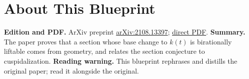 

\chapter*{About This Blueprint}
\label{birational-section-conjecture-strong-birationality-about}

\textbf{Edition and PDF.} ArXiv preprint \href{https://arxiv.org/abs/2108.13397}{arXiv:2108.13397};
\href{https://arxiv.org/pdf/2108.13397}{direct PDF}.
\textbf{Summary.} The paper proves that a section whose base change to $k(t)$ is birationally liftable
comes from geometry, and relates the section conjecture to cuspidalization.
\textbf{Reading warning.} This blueprint rephrases and distills the original paper; read it alongside the original.












